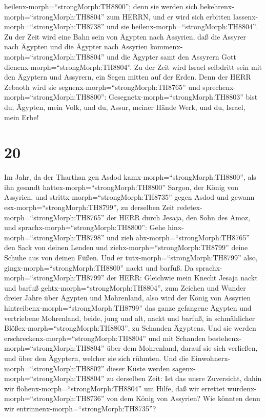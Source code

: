 heilenx-morph=``strongMorph:TH8800''; denn sie werden sich
bekehrenx-morph=``strongMorph:TH8804'' zum HERRN, und er wird sich
erbitten lassenx-morph=``strongMorph:TH8738'' und sie
heilenx-morph=``strongMorph:TH8804''.  Zu der Zeit wird
eine Bahn sein von Ägypten nach Assyrien, daß die Assyrer nach Ägypten
und die Ägypter nach Assyrien kommenx-morph=``strongMorph:TH8804'' und
die Ägypter samt den Assyrern Gott dienenx-morph=``strongMorph:TH8804''.
 Zu der Zeit wird Israel selbdritt sein mit den Ägyptern
und Assyrern, ein Segen mitten auf der Erden.  Denn der
HERR Zebaoth wird sie segnenx-morph=``strongMorph:TH8765'' und
sprechenx-morph=``strongMorph:TH8800'':
Gesegnetx-morph=``strongMorph:TH8803'' bist du, Ägypten, mein Volk, und
du, Assur, meiner Hände Werk, und du, Israel, mein Erbe!

\hypertarget{section-19}{%
\section{20}\label{section-19}}

 Im Jahr, da der Tharthan gen Asdod
kamx-morph=``strongMorph:TH8800'', als ihn gesandt
hattex-morph=``strongMorph:TH8800'' Sargon, der König von Assyrien, und
strittx-morph=``strongMorph:TH8735'' gegen Asdod und gewann
esx-morph=``strongMorph:TH8799'',  zu derselben Zeit
redetex-morph=``strongMorph:TH8765'' der HERR durch Jesaja, den Sohn des
Amoz, und sprachx-morph=``strongMorph:TH8800'': Gehe
hinx-morph=``strongMorph:TH8798'' und zieh
abx-morph=``strongMorph:TH8765'' den Sack von deinen Lenden und
ziehx-morph=``strongMorph:TH8799'' deine Schuhe aus von deinen Füßen.
Und er tutx-morph=``strongMorph:TH8799'' also,
gingx-morph=``strongMorph:TH8800'' nackt und barfuß.  Da
sprachx-morph=``strongMorph:TH8799'' der HERR: Gleichwie mein Knecht
Jesaja nackt und barfuß gehtx-morph=``strongMorph:TH8804'', zum Zeichen
und Wunder dreier Jahre über Ägypten und Mohrenland,  also
wird der König von Assyrien hintreibenx-morph=``strongMorph:TH8799'' das
ganze gefangene Ägypten und vertriebene Mohrenland, beide, jung und alt,
nackt und barfuß, in schmählicher Blößex-morph=``strongMorph:TH8803'',
zu Schanden Ägyptens.  Und sie werden
erschreckenx-morph=``strongMorph:TH8804'' und mit Schanden
bestehenx-morph=``strongMorph:TH8804'' über dem Mohrenland, darauf sie
sich verließen, und über den Ägyptern, welcher sie sich rühmten.
 Und die Einwohnerx-morph=``strongMorph:TH8802'' dieser
Küste werden sagenx-morph=``strongMorph:TH8804'' zu derselben Zeit: Ist
das unsre Zuversicht, dahin wir flohenx-morph=``strongMorph:TH8804'' um
Hilfe, daß wir errettet würdenx-morph=``strongMorph:TH8736'' von dem
König von Assyrien? Wie könnten denn wir
entrinnenx-morph=``strongMorph:TH8735''?

